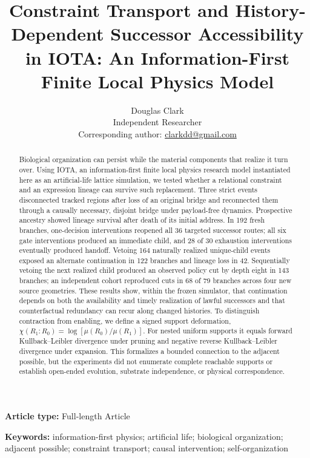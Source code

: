 \documentclass[11pt]{article}
\title{Constraint Transport and History-Dependent Successor Accessibility\\
in IOTA: An Information-First Finite Local Physics Model}
\author{Douglas Clark\\
\small Independent Researcher\\
\small Corresponding author: \href{mailto:clarkdd@gmail.com}{clarkdd@gmail.com}}
\date{}
\begin{document}
\maketitle

\noindent\textbf{Article type:} Full-length Article

\begin{abstract}
Biological organization can persist while the material components that realize
it turn over. Using IOTA, an information-first finite local physics research
model instantiated here as an artificial-life lattice simulation, we tested
whether a relational constraint and an expression lineage can survive such
replacement. Three strict events disconnected tracked regions after loss of an
original bridge and reconnected them through a causally necessary, disjoint
bridge under payload-free dynamics. Prospective ancestry showed lineage
survival after death of its initial address. In 192 fresh branches,
one-decision interventions reopened all 36 targeted successor routes; all six
gate interventions produced an immediate child, and 28 of 30 exhaustion
interventions eventually produced handoff. Vetoing 164 naturally realized
unique-child events exposed an alternate continuation in 122 branches and
lineage loss in 42. Sequentially vetoing the next realized child produced an
observed policy cut by depth eight in 143 branches; an independent cohort
reproduced cuts in 68 of 79 branches across four new source geometries. These
results show, within the frozen simulator, that continuation depends on both
the availability and timely realization of lawful successors and that
counterfactual redundancy can recur along changed histories. To distinguish
contraction from enabling, we define a signed support deformation,
$\chi(R_1\!:\!R_0)=\log[\mu(R_0)/\mu(R_1)]$. For nested uniform supports it
equals forward Kullback--Leibler divergence under pruning and negative reverse
Kullback--Leibler divergence under expansion. This formalizes a bounded
connection to the adjacent possible, but the experiments did not enumerate
complete reachable supports or establish open-ended evolution, substrate
independence, or physical correspondence.
\end{abstract}

\noindent\textbf{Keywords:} information-first physics; artificial life;
biological organization; adjacent possible; constraint transport; causal
intervention; self-organization

\linenumbers









\end{document}
